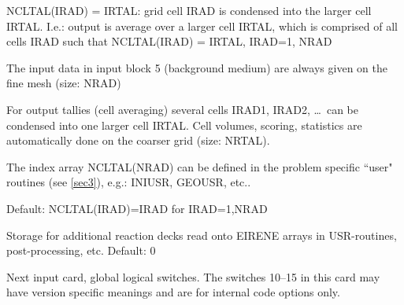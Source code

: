 \begin{description}
        NCLTAL(IRAD) = IRTAL: grid cell IRAD is condensed into the larger cell IRTAL.
        I.e.: output is average over a larger cell IRTAL, which is comprised of all
        cells IRAD such that NCLTAL(IRAD) = IRTAL,  IRAD=1, NRAD

        The input data in input block 5 (background medium) are always given on the
        fine mesh (size: NRAD)

        For output tallies (cell averaging) several cells IRAD1, IRAD2, \dots\ can be
        condensed into one larger cell IRTAL.
        Cell volumes, scoring, statistics are automatically done on the coarser grid
        (size: NRTAL).

        The index array NCLTAL(NRAD) can be defined in the problem specific ``user"
        routines (see \cref{sec3}), e.g.: INIUSR, GEOUSR, etc..

        Default: NCLTAL(IRAD)=IRAD for IRAD=1,NRAD
  \item[NREAC\_ADD] Storage for
        additional reaction decks read onto EIRENE arrays in USR-rou\-tines,
        post-processing, etc. Default: 0
\end{description}
Next input card, global
logical switches.
The switches 10--15 in this card may have version specific meanings and are for
internal code options only.
